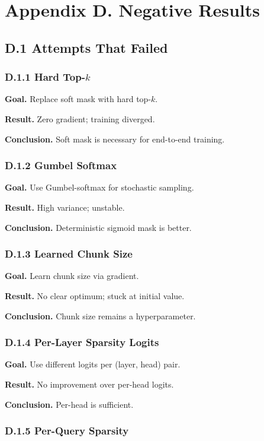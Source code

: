 
\section{Appendix D. Negative Results}

\subsection{D.1 Attempts That Failed}

\subsubsection{D.1.1 Hard Top-$k$}

\textbf{Goal.} Replace soft mask with hard top-$k$.

\textbf{Result.} Zero gradient; training diverged.

\textbf{Conclusion.} Soft mask is necessary for end-to-end training.

\subsubsection{D.1.2 Gumbel Softmax}

\textbf{Goal.} Use Gumbel-softmax for stochastic sampling.

\textbf{Result.} High variance; unstable.

\textbf{Conclusion.} Deterministic sigmoid mask is better.

\subsubsection{D.1.3 Learned Chunk Size}

\textbf{Goal.} Learn chunk size via gradient.

\textbf{Result.} No clear optimum; stuck at initial value.

\textbf{Conclusion.} Chunk size remains a hyperparameter.

\subsubsection{D.1.4 Per-Layer Sparsity Logits}

\textbf{Goal.} Use different logits per (layer, head) pair.

\textbf{Result.} No improvement over per-head logits.

\textbf{Conclusion.} Per-head is sufficient.

\subsubsection{D.1.5 Per-Query Sparsity}

